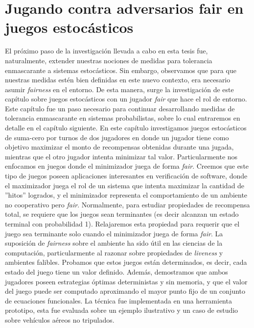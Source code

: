 \chapter{Jugando contra adversarios fair en juegos estocásticos}
\label{cap:fairAdversaries}

El próximo paso de la investigación llevada a cabo en esta tesis fue, naturalmente, extender nuestras nociones de medidas para tolerancia enmascarante a sistemas estocásticos. Sin embargo, observamos que para que nuestras medidas estén bien definidas en este nuevo contexto, era necesario asumir \textit{fairness} en el entorno. De esta manera, surge la investigación de este capítulo  sobre juegos estocásticos con un jugador \textit{fair} que hace el rol de entorno. Este capítulo fue un paso necesario para continuar desarrollando medidas de tolerancia enmascarante en sistemas probabilistas, sobre lo cual entraremos en detalle en el capítulo siguiente.
En este capítulo investigamos juegos estocásticos de suma-cero por turnos de dos jugadores en donde un jugador tiene como objetivo maximizar el monto de recompensas obtenidas durante una jugada, mientras que el otro jugador intenta minimizar tal valor. Particularmente nos enfocamos en juegos donde el minimizador juega de forma \textit{fair}. Creemos que este tipo de juegos poseen aplicaciones interesantes en verificación de software, donde el maximizador juega el rol de un sistema que intenta maximizar la cantidad de ''hitos'' logrados, y el minimizador representa el comportamiento de un ambiente no cooperativo pero \textit{fair}.
Normalmente, para estudiar propiedades de recompensa total, se requiere que los juegos sean terminantes (es decir alcanzan un estado terminal con probabilidad 1). 
Relajaremos esta propiedad para requerir que el juego sea terminante solo cuando el minimizador juega de forma \textit{fair}. La suposición de \textit{fairness} sobre el ambiente ha sido útil en las ciencias de la computación, particularmente al razonar sobre propiedades de \textit{liveness} y ambientes falibles.
Probamos que estos juegos están determinados, es decir, cada estado del juego tiene un valor definido. Además, demostramos que ambos jugadores poseen estrategias óptimas deterministas y sin memoria, y que el valor del juego puede ser computado aproximando el mayor punto fijo de un conjunto de ecuaciones funcionales. La técnica fue implementada en una herramienta prototipo, esta fue evaluada sobre un ejemplo ilustrativo y un caso de estudio sobre vehículos aéreos no tripulados.









